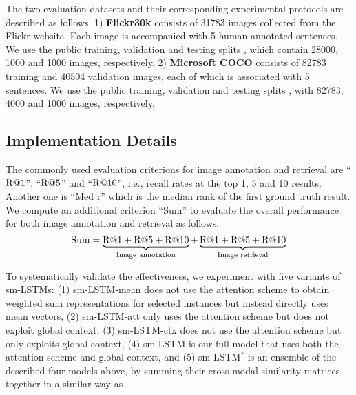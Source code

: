 \documentclass[10pt,twocolumn,letterpaper]{article}
\begin{document}
The two evaluation datasets and their corresponding experimental protocols are described as follows.
1) \textbf{Flickr30k} \cite{young2014image}
consists of 31783 images collected from the Flickr website.
Each image is accompanied with 5 human annotated sentences.
We use the public training, validation and testing splits \cite{kiros2014unifying}, which
contain 28000, 1000 and 1000 images, respectively.
2) \textbf{Microsoft COCO} \cite{lin2014microsoft} consists of 82783
training and 40504 validation images, each of which is associated with 5 sentences.
We use the public training, validation and testing splits \cite{kiros2014unifying}, with
82783, 4000 and 1000 images, respectively.






\subsection{Implementation Details} \label{sent:details}
The commonly used evaluation criterions for image annotation and retrieval
are ``$\rm R@1$'', ``$\rm R@5$'' and ``$\rm R@10$'',
i.e., recall rates at the top 1, 5 and 10 results.
Another one is ``Med r'' which is the median rank of the first ground truth result.
We compute an additional criterion ``Sum'' to evaluate the overall performance for
both image annotation and retrieval as follows:
\begin{equation*}
\rm Sum = \underbrace {\rm R@1 + \rm R@5 + \rm R@10}_{ Image{\kern 3pt}  annotation} + \underbrace {\rm R@1 + \rm R@5 + \rm R@10}_{Image {\kern 3pt} retrieval}
\end{equation*}

To systematically validate the effectiveness,
we experiment with five variants of sm-LSTMs:
(1) sm-LSTM-mean does not use the attention scheme to obtain weighted sum
representations for selected instances but instead directly uses mean vectors,
(2) sm-LSTM-att only uses the attention scheme but does not exploit global context,
(3) sm-LSTM-ctx does not use the attention scheme but only exploits global context,
(4) sm-LSTM is our full model that uses both the attention scheme and global context,
and (5) sm-LSTM$^*$ is an ensemble of the described four models above,
by summing their cross-modal similarity matrices together in a similar way as \cite{ma2015multimodal}.
\end{document}
